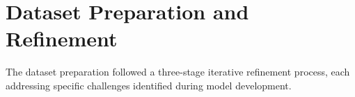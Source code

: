 \documentclass[a4paper,12pt]{report}
\begin{document}






\section{Dataset Preparation and Refinement}

The dataset preparation followed a three-stage iterative refinement process, each addressing specific challenges identified during model development.
\end{document}
